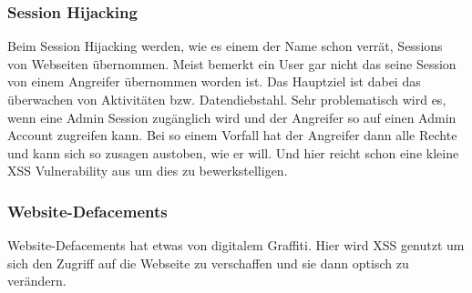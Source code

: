 \subsubsection{Session Hijacking}
\label{sec:xss_session_hijacking}
Beim Session Hijacking werden, wie es einem der Name schon verrät, Sessions von Webseiten übernommen. Meist bemerkt ein User gar nicht das seine Session von einem Angreifer übernommen worden ist. Das Hauptziel ist dabei das überwachen von Aktivitäten bzw. Datendiebstahl. Sehr problematisch wird es, wenn eine Admin Session zugänglich wird und der Angreifer so auf einen Admin Account zugreifen kann. Bei so einem Vorfall hat der Angreifer dann alle Rechte und kann sich so zusagen austoben, wie er will. Und hier reicht schon eine kleine XSS Vulnerability aus um dies zu bewerkstelligen. 
\subsubsection{Website-Defacements}
\label{sec:xss_web_def}
Website-Defacements hat etwas von digitalem Graffiti. Hier wird XSS genutzt um sich den Zugriff auf die Webseite zu verschaffen und sie dann optisch zu verändern. 
